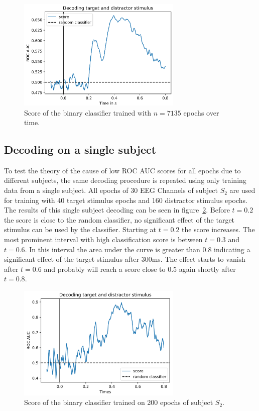 \documentclass[a4paper]{article}
\begin{document}
\begin{figure}[tbh!] 
  \centering
     \includegraphics[width=0.7\textwidth]{decodingScore.png}
  \caption{Score of the binary classifier trained with $n=7135$ epochs over time.}
  \label{fig:decodingScore}
\end{figure}

\subsection{Decoding on a single subject}
To test the theory of the cause of low ROC AUC scores for all epochs due to different subjects, the same decoding procedure is repeated using only training data from a single subject.
All epochs of 30 EEG Channels of subject $S_2$ are used for training with 40 target stimulus epochs and 160 distractor stimulus epochs.
The results of this single subject decoding can be seen in figure~\ref{fig:decodingScoreS2}.
Before $t=0.2$ the score is close to the random classifier, no significant effect of the target stimulus can be used by the classifier.
Starting at $t=0.2$ the score increases.
The most prominent interval with high classification score is between $t=0.3$ and $t=0.6$.
In this interval the area under the curve is greater than 0.8 indicating a significant effect of the target stimulus after 300ms.
The effect starts to vanish after $t=0.6$ and probably will reach a score close to 0.5 again shortly after $t=0.8$.
\begin{figure}[tbh!] 
  \centering
     \includegraphics[width=0.7\textwidth]{decodingScoreS2.png}
  \caption{Score of the binary classifier trained on 200 epochs of subject $S_2$.}
  \label{fig:decodingScoreS2}
\end{figure}
\end{document}
